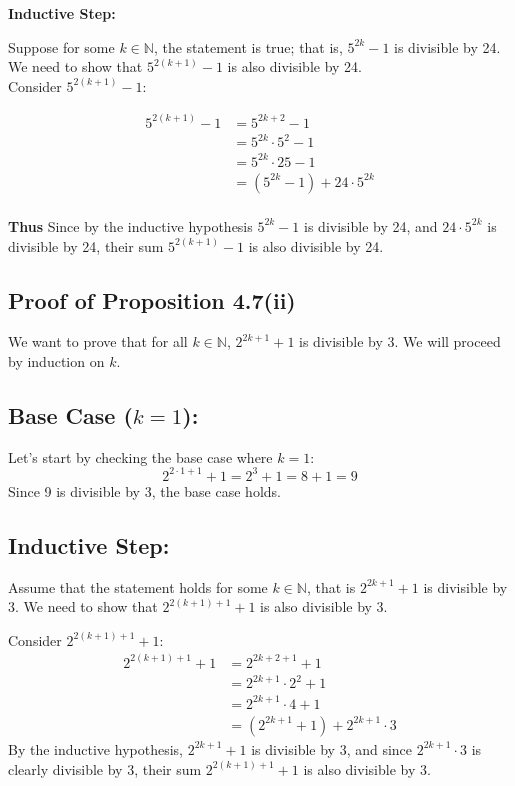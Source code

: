 \documentclass[12pt]{article}
\begin{document}
\noindent \textbf{Inductive Step:}

\noindent Suppose for some \( k \in \mathbb{N} \), the statement is true; that is, \( 5^{2k} - 1 \) is divisible by 24. We need to show that \( 5^{2(k+1)} - 1 \) is also divisible by 24. \\

\noindent Consider \( 5^{2(k+1)} - 1 \):

\begin{align*}
5^{2(k+1)} - 1 &= 5^{2k+2} - 1 \\
&= 5^{2k} \cdot 5^2 - 1 \\
&= 5^{2k} \cdot 25 - 1 \\
&= (5^{2k} - 1) + 24 \cdot 5^{2k} \\
\end{align*}

\noindent \textbf{Thus} Since by the inductive hypothesis \( 5^{2k} - 1 \) is divisible by 24, and \( 24 \cdot 5^{2k} \) is divisible by 24, their sum \( 5^{2(k+1)} - 1 \) is also divisible by 24.

\subsection*{Proof of Proposition 4.7(ii)}

We want to prove that for all \( k \in \mathbb{N} \), \( 2^{2k+1} + 1 \) is divisible by 3. We will proceed by induction on \( k \).

\subsection*{Base Case (\(k=1\)):}
Let's start by checking the base case where \( k = 1 \):
\[ 2^{2\cdot1+1} + 1 = 2^3 + 1 = 8 + 1 = 9 \]
Since 9 is divisible by 3, the base case holds.

\subsection*{Inductive Step:}
Assume that the statement holds for some \( k \in \mathbb{N} \), that is \( 2^{2k+1} + 1 \) is divisible by 3. We need to show that \( 2^{2(k+1)+1} + 1 \) is also divisible by 3.

Consider \( 2^{2(k+1)+1} + 1 \):
\begin{align*}
2^{2(k+1)+1} + 1 &= 2^{2k+2+1} + 1 \\
                 &= 2^{2k+1} \cdot 2^2 + 1 \\
                 &= 2^{2k+1} \cdot 4 + 1 \\
                 &= (2^{2k+1} + 1) + 2^{2k+1} \cdot 3
\end{align*}
By the inductive hypothesis, \( 2^{2k+1} + 1 \) is divisible by 3, and since \( 2^{2k+1} \cdot 3 \) is clearly divisible by 3, their sum \( 2^{2(k+1)+1} + 1 \) is also divisible by 3.
\end{document}
